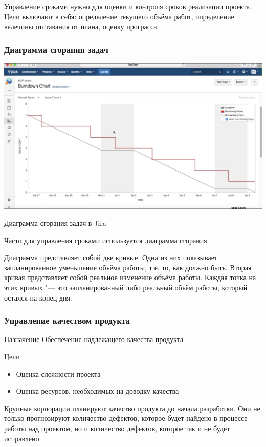 \documentclass{../industrial-development}
\begin{document}
Управление сроками нужно для оценки и контроля сроков реализации проекта. Цели включают в себя: определение текущего объёма работ, определение велечины отставания от плана, оценку програсса.

\begin{frame} \frametitle{Диаграмма сгорания задач}
	\centerline{\includegraphics[width=1\textwidth]{burn.jpg}}
	\centerline{Диаграмма сгорания задач в Jira}
\end{frame}
\lecturenotes

Часто для управления сроками используется диаграмма сгорания. 

Диаграмма представляет собой две кривые. Одна из них показывает запланированное уменьшение объёма работы, т.е. то, как должно быть. Вторая кривая представляет собой реальное изменение объёма работы. Каждая точка на этих кривых "--- это запланированный либо реальный объём работы, который остался на конец дня.

\begin{frame} \frametitle{Управление качеством продукта}
	\begin{block}{Назначение}
		Обеспечение надлежащего качества продукта
	\end{block}
	Цели
	\begin{itemize}
		\item Оценка сложности проекта
		\item Оценка ресурсов, необходимых на доводку качества
	\end{itemize}
\end{frame}
\lecturenotes

Крупные корпорации планируют качество продукта до начала разработки. Они не только прогнозируют количество дефектов, которое будет найдено в процессе работы над проектом, но и количество дефектов, которое так и не будет исправлено.
\end{document}
